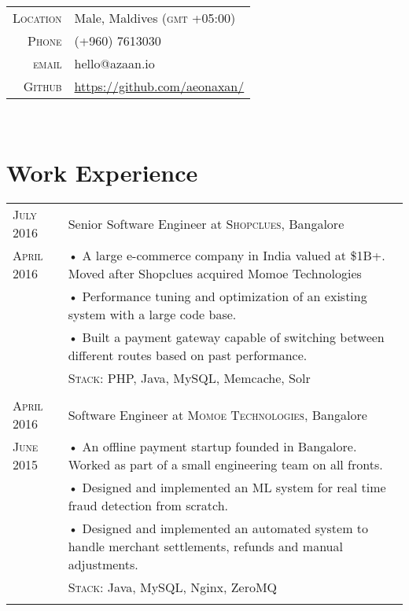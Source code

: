 \documentclass[a4paper,11pt]{article}
\begin{document}
\pagestyle{empty}

\\[15pt]
\begin{tabular}{rl}
    \textsc{Location} & Male, Maldives (\textsc{gmt} +05:00) \\
    \textsc{Phone} & (+960) 7613030 \\
    \textsc{email} & hello@azaan.io
    \\[5pt]
    \textsc{Github} & \url{https://github.com/aeonaxan/}
\end{tabular}
\\[15pt]

\section{Work Experience}
\begin{tabular}{ p{2.5cm} | p{12cm} }
    \textsc{July 2016} & Senior Software Engineer at \textsc{Shopclues}, Bangalore \\
    \textsc{April 2016} 
        & \footnotesize{• A large e-commerce company in India valued at \$1B+. Moved after Shopclues acquired Momoe Technologies} \\
        & \footnotesize{• Performance tuning and optimization of an existing system with a large code base.} \\
        & \footnotesize{• Built a payment gateway capable of switching between different routes based on past performance. } \\
        & \footnotesize{\textsc{Stack: } PHP, Java, MySQL, Memcache, Solr} \\
    \multicolumn{2}{c}{} \\
    
    \textsc{April 2016} & Software Engineer at \textsc{Momoe Technologies}, Bangalore \\
    \textsc{June 2015} 
        & \footnotesize{• An offline payment startup founded in Bangalore. Worked as part of a small engineering team on all fronts.} \\
        & \footnotesize{• Designed and implemented an ML system for real time fraud detection from scratch.} \\
        & \footnotesize{• Designed and implemented an automated system to handle merchant settlements, refunds and manual adjustments.} \\
        & \footnotesize{\textsc{Stack: } Java, MySQL, Nginx, ZeroMQ} \\
    \multicolumn{2}{c}{} \\
\end{tabular}
\end{document}
